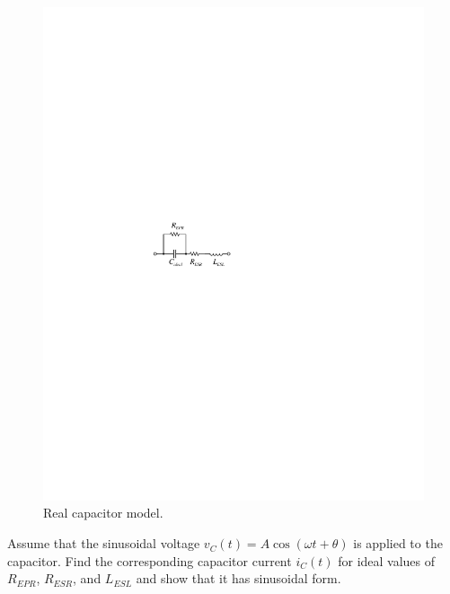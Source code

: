 \documentclass[11pt]{article}
\begin{document}
\begin{question}


    \begin{figure}[H]
        \centering
        \includegraphics[scale=1.5,angle=0]{Fig/cir4.pdf}
        \caption{Real capacitor model.} \label{fig:cir4}
    \end{figure}

    \begin{subquestion}{Assume that the sinusoidal voltage $v_C(t)=A\cos(\omega t+\theta)$ is applied to the capacitor. Find the corresponding capacitor current $i_C(t)$ for ideal values of $R_{EPR}$, $R_{ESR}$, and $L_{ESL}$ and show that it has sinusoidal form.}
\end{subquestion}
\end{question}
\end{document}
